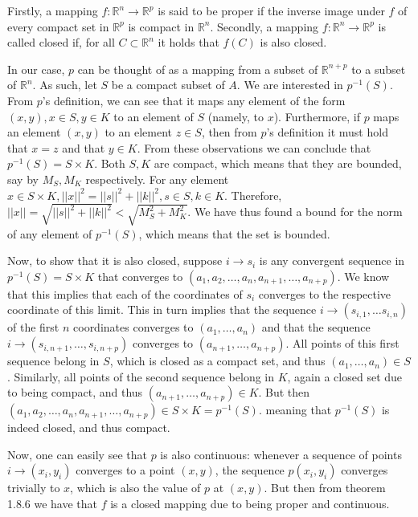 \begin{solution}

    Firstly, a mapping $f: \mathbb{R}^n \rightarrow \mathbb{R}^p$ is said to be proper if the inverse image under $f$ of every compact set in $\mathbb{R}^p$ is compact in $\mathbb{R}^n$. Secondly, a mapping $f: \mathbb{R}^n \rightarrow \mathbb{R}^p$ is called closed if, for all $C \subset \mathbb{R}^n$ it holds that $f(C)$ is also closed.

    In our case, $p$ can be thought of as a mapping from a subset of $\mathbb{R}^{n+p}$ to a subset of $\mathbb{R}^n$. As such, let $S$ be a compact subset of $A$. We are interested in $p^{-1}(S)$. From $p$'s definition, we can see that it maps any element of the form $(x, y), x \in S, y \in K$ to an element of $S$ (namely, to $x$). Furthermore, if $p$ maps an element $(x, y)$ to an element $z \in S$, then from $p$'s definition it must hold that $x = z$ and that $y \in K$. From these observations we can conclude that $p^{-1}(S) = S \times K$. Both $S, K$ are compact, which means that they are bounded, say by $M_S, M_K$ respectively. For any element $x \in S \times K, \lvert \lvert x \rvert \rvert^2 = \lvert \lvert s \rvert \rvert^2 + \lvert \lvert k \rvert \rvert^2, s \in S, k \in K$. Therefore, $\lvert \lvert x \rvert \rvert = \sqrt{\lvert \lvert s \rvert \rvert^2 + \lvert \lvert k \rvert \rvert^2} < \sqrt{M_S^2 + M_K^2}$. We have thus found a bound for the norm of any element of $p^{-1}(S)$, which means that the set is bounded.

    Now, to show that it is also closed, suppose $i \rightarrow s_i$ is any convergent sequence in $p^{-1}(S) = S \times K$ that converges to $(a_1, a_2, \ldots, a_n, a_{n+1}, \ldots, a_{n+p})$. We know that this implies that each of the coordinates of $s_i$ converges to the respective coordinate of this limit. This in turn implies that the sequence $i \rightarrow (s_{i,1}, \ldots s_{i,n})$ of the first $n$ coordinates converges to $(a_1, \ldots, a_n)$ and that the sequence $i \rightarrow (s_{i, n+1}, \ldots, s_{i, n+p})$ converges to $(a_{n+1}, \ldots, a_{n+p})$. All points of this first sequence belong in $S$, which is closed as a compact set, and thus $(a_1, \ldots, a_n) \in S$. Similarly, all points of the second sequence belong in $K$, again a closed set due to being compact, and thus $(a_{n+1}, \ldots, a_{n+p}) \in K$. But then $(a_1, a_2, \ldots, a_n, a_{n+1}, \ldots, a_{n+p}) \in S \times K = p^{-1}(S)$. meaning that $p^{-1}(S)$ is indeed closed, and thus compact.

    Now, one can easily see that $p$ is also continuous: whenever a sequence of points $i \rightarrow (x_i, y_i)$ converges to a point $(x, y)$, the sequence $p(x_i, y_i)$ converges trivially to $x$, which is also the value of $p$ at $(x, y)$. But then from theorem 1.8.6 we have that $f$ is a closed mapping due to being proper and continuous.
\end{solution}

